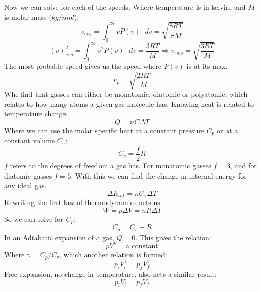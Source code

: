 \documentclass[11pt]{article}
\begin{document}
    Now we can solve for each of the speeds, Where temperature is in kelvin,
    and $M$ is molar mass ($kg/mol$):
    \begin{equation}
        v_{avg} = \int_{0}^{\infty} v P(v) \text{ } dv = \sqrt{\frac{8RT}{\pi M}}
    \end{equation}
    \begin{equation}
    (v)^2_{avg} = \int_{0}^{\infty} v^2 P(v) \text{ } dv = \frac{3RT}{ M} \Rightarrow v_{rms} = \sqrt{\frac{3RT}{M}}
    \end{equation}
    The most probable speed gives us the speed where $P(v)$ is at its max.
    \begin{equation}
        v_p = \sqrt{\frac{2RT}{M}}
    \end{equation}
    \newpage
    Whe find that gasses can either be monatomic, diatomic or polyatomic, which relates to
    how many atoms a given gas molecule has.
    Knowing heat is related to temperature change:
    \begin{equation}
        Q = nC \Delta T 
    \end{equation}
    Where we can use the molar specific heat at a constant pressure $C_p$ or
    at a constant volume $C_v$:
    \begin{equation}
        C_v = \frac{f}{2} R
    \end{equation}
    $f$ refers to the degrees of freedom a gas has.
    For monatomic gasses $f = 3$, and for diatomic gasses $f =5$.
    With this we can find the change in internal energy for any ideal gas.
    \begin{equation}
        \Delta E_{int} = nC_{\text{v}} \Delta T \tag{ideal gas, all processes}
    \end{equation}
    Rewriting the first law of thermodynamics nets us:
    \begin{equation}
        W = p \Delta V = nR \Delta T
    \end{equation}
    So we can solve for $C_p$:
    \begin{equation}
        C_p = C_v + R
    \end{equation}
    In an Adiabatic expansion of a gas, $Q = 0$.
    This gives the relation:
    \begin{equation}
        pV^{\gamma} = \text{a constant} \tag{adiabatic process}
    \end{equation}
    Where $\gamma = C_p/C_v$, which another relation is formed:
    \begin{equation}
        p_i V_i^{\gamma} = p_f V_f^{\gamma} \tag {adiabatic process}
    \end{equation}
    Free expansion, no change in temperature, also nets a similar result:
    \begin{equation}
        p_i V_i = p_f V_f \tag {free expansion}
    \end{equation}
\end{document}

